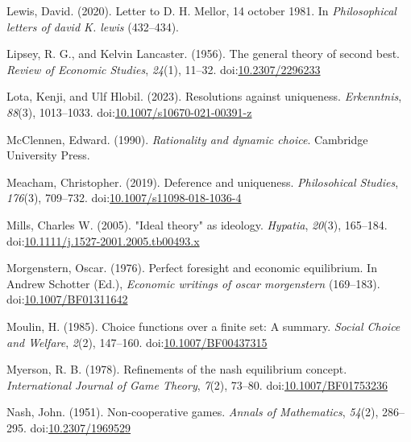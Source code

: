 \documentclass[
  12pt,
  letterpaper,
  DIV=11,
  numbers=noendperiod]{scrreprt}
\newlength{\cslhangindent}
\newenvironment{CSLReferences}[2] %
 {\begin{list}{}{%
  \setlength{\itemindent}{0pt}
  \setlength{\leftmargin}{0pt}
  \setlength{\parsep}{0pt}
  \ifodd #1
   \setlength{\leftmargin}{\cslhangindent}
   \setlength{\itemindent}{-1\cslhangindent}
  \fi
  \setlength{\itemsep}{#2\baselineskip}}}
 {\end{list}}
\begin{document}
\begin{CSLReferences}{1}{0}
Lewis, David. (2020). Letter to {D}. H. Mellor, 14 october 1981. In
\emph{Philosophical letters of david {K}. lewis} (432--434).

Lipsey, R. G., and Kelvin Lancaster. (1956). The general theory of
second best. \emph{Review of Economic Studies}, \emph{24}(1), 11--32.
doi:\href{https://doi.org/10.2307/2296233}{10.2307/2296233}

Lota, Kenji, and Ulf Hlobil. (2023). Resolutions against uniqueness.
\emph{Erkenntnis}, \emph{88}(3), 1013--1033.
doi:\href{https://doi.org/10.1007/s10670-021-00391-z}{10.1007/s10670-021-00391-z}

McClennen, Edward. (1990). \emph{Rationality and dynamic choice}.
{C}ambridge {U}niversity {P}ress.

Meacham, Christopher. (2019). Deference and uniqueness.
\emph{Philosohical Studies}, \emph{176}(3), 709--732.
doi:\href{https://doi.org/10.1007/s11098-018-1036-4}{10.1007/s11098-018-1036-4}

Mills, Charles W. (2005). "Ideal theory" as ideology. \emph{Hypatia},
\emph{20}(3), 165--184.
doi:\href{https://doi.org/10.1111/j.1527-2001.2005.tb00493.x}{10.1111/j.1527-2001.2005.tb00493.x}

Morgenstern, Oscar. (1976). Perfect foresight and economic equilibrium.
In Andrew Schotter (Ed.), \emph{Economic writings of oscar morgenstern}
(169--183).
doi:\href{https://doi.org/10.1007/BF01311642}{10.1007/BF01311642}

Moulin, H. (1985). Choice functions over a finite set: A summary.
\emph{Social Choice and Welfare}, \emph{2}(2), 147--160.
doi:\href{https://doi.org/10.1007/BF00437315}{10.1007/BF00437315}

Myerson, R. B. (1978). Refinements of the nash equilibrium concept.
\emph{International Journal of Game Theory}, \emph{7}(2), 73--80.
doi:\href{https://doi.org/10.1007/BF01753236}{10.1007/BF01753236}

Nash, John. (1951). Non-cooperative games. \emph{Annals of Mathematics},
\emph{54}(2), 286--295.
doi:\href{https://doi.org/10.2307/1969529}{10.2307/1969529}


\end{CSLReferences}
\end{document}
